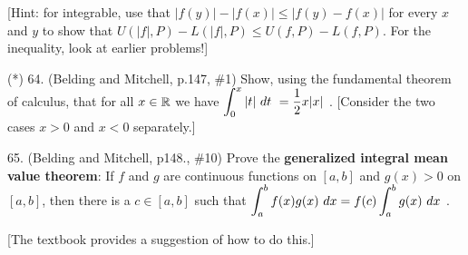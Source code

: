 \documentclass[12pt]{article}
\begin{document}
\begin{description}
\ssk

\item{\spc} [Hint: for integrable, use that $|f(y)|-|f(x)|\leq |f(y)-f(x)|$ 
for every $x$ and $y$ to show that $U(|f|,P)-L(|f|,P)\leq U(f,P)-L(f,P)$. For the
inequality, look at earlier problems!]

\msk

\item{(*) 64.} (Belding and Mitchell, p.147, \#1) Show, using the fundamental theorem of 
calculus, that for all $x\in{\mathbb R}$ we have 
$\displaystyle \int_0^x |t|\ dt\ = {{1}\over{2}} x|x|$ . [Consider the two cases $x > 0$ and $x < 0$
separately.]

\msk

\item{65.} (Belding and Mitchell, p148., \#10) Prove the {\bf generalized integral mean value theorem}: 
If $f$ and $g$ are
continuous functions on $[a,b]$ and $g(x) > 0$ on $[a,b]$, then there is a $c\in [a,b]$ such
that
$\displaystyle\int_a^b f(x)g(x)\ dx = f(c)\int_a^b g(x)\ dx$ .

\ssk

\item{\spc} [The textbook provides a suggestion of how to do this.]

\msk

\end{description}
\vfill
\end{document}
